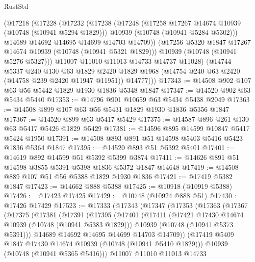 \begin{lexlean}{RustStd}
\begin{coremodule}
        (@17218
          (@17228
            (@17232
              (@17238
                (@17248
                  (@17258 @17267 @14674 @10939 (@10748 (@10941 @5294 @1829)))
                  @10939
                  (@10748 (@10941 @5284 @5302)))
                @14689
                @14692
                @14695
                @14699
                @14703
                @14709))
            (@17256 @5320 @1847 @17267 @14674 @10939 (@10748 (@10941 @5321 @1829)))
            @10939
            (@10748 (@10941 @5276 @5327)))
          @11007
          @11010
          @11013
          @14733
          @14737
          @11028)
        (@14744
          @5337
          @240
          @130
          @63
          @1829
          @2420
          @1829
          @1968
          (@14754 @240 @63 @2420 (@14758 @239 @2420 @11947 @11951))
          @14777)))
@17343 := @14508 @902 @107 @63 @56 @5442 @1829 @1930 @1836 @5348 @1847
@17347 := @14520 @902 @63 @5434 @5440
@17353 := @14796 @901 @10659 @63 @5434 @5438 @2049
@17363 := @14508 @899 @107 @63 @56 @5431 @1829 @1930 @1836 @5356 @1847
@17367 := @14520 @899 @63 @5417 @5429
@17375 := @14587 @896 @261 @130 @63 @5417 @5426 @1829 @5429
@17381 := @14596 @895 @14599 @10847 @5417 @5424 @1950
@17391 := @14508 @893 @891 @51 @14598 @5403 @5416 @5423 @1836 @5364 @1847
@17395 := @14520 @893 @51 @5392 @5401
@17401 := @14619 @892 @14599 @51 @5392 @5399 @3874
@17411 := @14626 @891 @51 @14598 @3855 @5391 @5398 @1836 @5372 @1847 @14648
@17419 := @14508 @889 @107 @51 @56 @5388 @1829 @1930 @1836
@17421 := @17419 @5382 @1847
@17423 := @14662 @888 @5388
@17425 := @10918 (@10919 @5388)
@17426 := @17423 @17425
@17429 := @10748 (@10924 @888 @51)
@17430 := @17426 @17429
@17523 := @17333
    (@17343
      (@17347
        (@17353
          (@17363
            (@17367
              (@17375
                (@17381
                  (@17391
                    (@17395
                      (@17401
                        (@17411
                          (@17421 @17430 @14674 @10939 (@10748 (@10941 @5383 @1829)))
                          @10939
                          (@10748 (@10941 @5373 @5391)))
                        @14689
                        @14692
                        @14695
                        @14699
                        @14703
                        @14709))
                    (@17419 @5409 @1847 @17430 @14674 @10939 (@10748 (@10941 @5410 @1829)))
                    @10939
                    (@10748 (@10941 @5365 @5416)))
                  @11007
                  @11010
                  @11013
                  @14733

\end{coremodule}
\end{lexlean}
